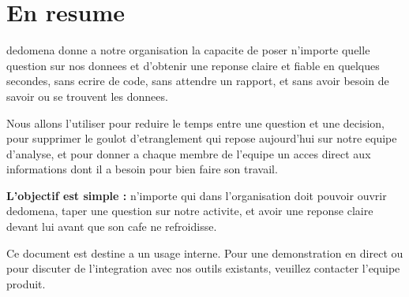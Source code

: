 \documentclass[12pt, a4paper]{article}
\begin{document}
\section{En resume}

dedomena donne a notre organisation la capacite de poser n'importe quelle question
sur nos donnees et d'obtenir une reponse claire et fiable en quelques secondes,
sans ecrire de code, sans attendre un rapport, et sans avoir besoin de savoir ou
se trouvent les donnees.

Nous allons l'utiliser pour reduire le temps entre une question et une decision,
pour supprimer le goulot d'etranglement qui repose aujourd'hui sur notre equipe
d'analyse, et pour donner a chaque membre de l'equipe un acces direct aux
informations dont il a besoin pour bien faire son travail.

\begin{callout}
  \textbf{L'objectif est simple :} n'importe qui dans l'organisation doit pouvoir
  ouvrir dedomena, taper une question sur notre activite, et avoir une reponse
  claire devant lui avant que son cafe ne refroidisse.
\end{callout}

\vspace{2em}
\textcolor{mutedtext}{\small Ce document est destine a un usage interne. Pour une
demonstration en direct ou pour discuter de l'integration avec nos outils existants,
veuillez contacter l'equipe produit.}
\end{document}
